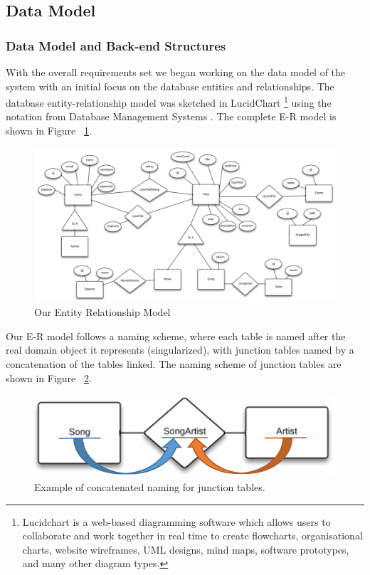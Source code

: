 \subsection{Data Model}
\subsubsection{Data Model and Back-end Structures}
\label{sec:datamodel}

With the overall requirements set we began working on the data model of the system with an initial focus on the database entities and relationships. The database entity-relationship model was sketched in LucidChart \footnote{Lucidchart is a web-based diagramming software which allows users to collaborate and work together in real time to create flowcharts, organisational charts, website wireframes, UML designs, mind maps, software prototypes, and many other diagram types.} using the notation from Database Management Systems \cite{dbbook}. The complete E-R  model is shown in Figure ~\ref{fig:erd}.

\begin{figure}[t]
	\centering
	\includegraphics[scale=0.5]{./p1design/erdmodel.png}
	\caption{Our Entity Relationship Model}
	\label{fig:erd}
\end{figure}

Our E-R model follows a naming scheme, where each table is named after the real domain object it represents (singularized), with junction tables named by a concatenation of the tables linked. The naming scheme of junction tables are shown in Figure ~\ref{fig:junctionfigure}.


\begin{figure}[h]
	\centering
	\includegraphics[scale=0.5]{./p1design/junctionfigure.png}
	\caption{Example of concatenated naming for junction tables.}
	\label{fig:junctionfigure}
\end{figure}


